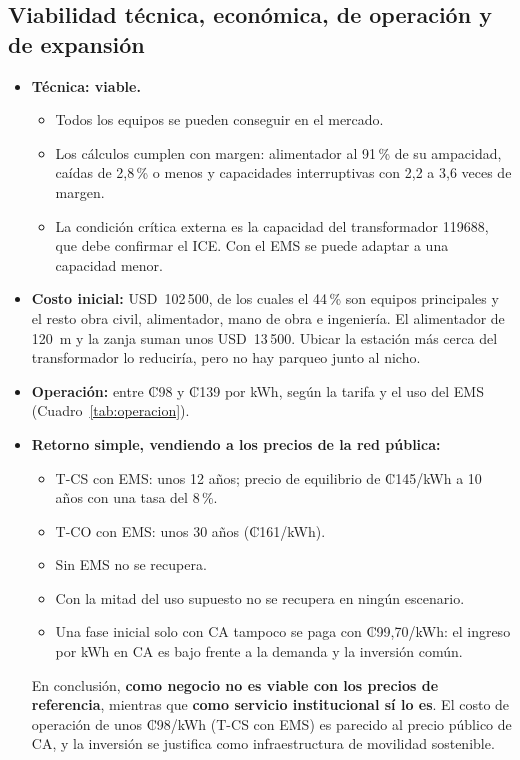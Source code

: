 \subsection{Viabilidad técnica, económica, de operación y de expansión}
\label{sec:viabilidad}
\begin{itemize}
\item \textbf{Técnica: viable.}
  \begin{itemize}
  \item Todos los equipos se pueden conseguir en el mercado.
  \item Los cálculos cumplen con margen: alimentador al 91\,\% de su ampacidad, caídas de 2,8\,\% o menos y capacidades interruptivas con 2,2 a 3,6 veces de margen.
  \item La condición crítica externa es la capacidad del transformador 119688, que debe confirmar el ICE. Con el EMS se puede adaptar a una capacidad menor.
  \end{itemize}
\item \textbf{Costo inicial:} USD~102\,500, de los cuales el 44\,\% son equipos principales y el resto obra civil, alimentador, mano de obra e ingeniería. El alimentador de 120~m y la zanja suman unos USD~13\,500. Ubicar la estación más cerca del transformador lo reduciría, pero no hay parqueo junto al nicho.
\item \textbf{Operación:} entre ₡98 y ₡139 por kWh, según la tarifa y el uso del EMS (Cuadro~\ref{tab:operacion}).
\item \textbf{Retorno simple, vendiendo a los precios de la red pública:}
  \begin{itemize}
  \item T-CS con EMS: unos 12 años; precio de equilibrio de ₡145/kWh a 10 años con una tasa del 8\,\%.
  \item T-CO con EMS: unos 30 años (₡161/kWh).
  \item Sin EMS no se recupera.
  \item Con la mitad del uso supuesto no se recupera en ningún escenario.
  \item Una fase inicial solo con CA tampoco se paga con ₡99,70/kWh: el ingreso por kWh en CA es bajo frente a la demanda y la inversión común.
  \end{itemize}
  En conclusión, \textbf{como negocio no es viable con los precios de referencia}, mientras que \textbf{como servicio institucional sí lo es}. El costo de operación de unos ₡98/kWh (T-CS con EMS) es parecido al precio público de CA, y la inversión se justifica como infraestructura de movilidad sostenible.

\end{itemize}
